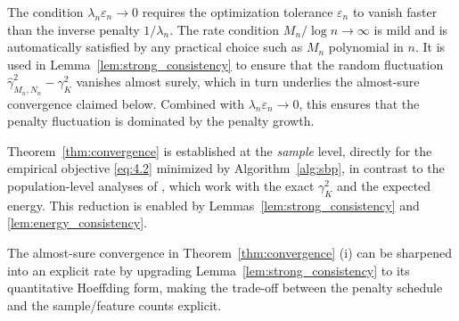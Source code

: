 \documentclass[11pt,leqno]{article}
\theoremstyle{plain}
\theoremstyle{remark}
\theoremstyle{definition}
\numberwithin{equation}{section}
\numberwithin{figure}{section}
\numberwithin{table}{section}
\numberwithin{algorithm}{section}
\begin{document}
The condition $\lambda_n\varepsilon_n\to 0$ requires the optimization tolerance $\varepsilon_n$
to vanish faster than the inverse penalty $1/\lambda_n$.
The rate condition $M_n/\log n\to\infty$ is mild
and is automatically satisfied by any practical choice such as $M_n$ polynomial in $n$.
It is used in Lemma~\ref{lem:strong_consistency} to ensure 
that the random fluctuation $\hat{\gamma}_{M_n,N_n}^2 - \gamma_K^2$ vanishes almost surely, 
which in turn underlies the almost-sure convergence claimed below.
Combined with $\lambda_n\varepsilon_n\to 0$, this ensures that the penalty fluctuation
is dominated by the penalty growth.

Theorem~\ref{thm:convergence} is established at the \emph{sample} level, directly for the empirical objective \eqref{eq:4.2} minimized by Algorithm~\ref{alg:sbp}, in contrast to the population-level analyses of \cite{nak:2024sb,sai-nak:2025},
which work with the exact $\gamma_K^2$ and the expected energy.
This reduction is enabled by Lemmas~\ref{lem:strong_consistency} and \ref{lem:energy_consistency}.

The almost-sure convergence in Theorem~\ref{thm:convergence} (i) can be sharpened into an explicit rate
by upgrading Lemma~\ref{lem:strong_consistency} to its quantitative Hoeffding form,
making the trade-off between the penalty schedule and the sample/feature counts explicit.
\end{document}
